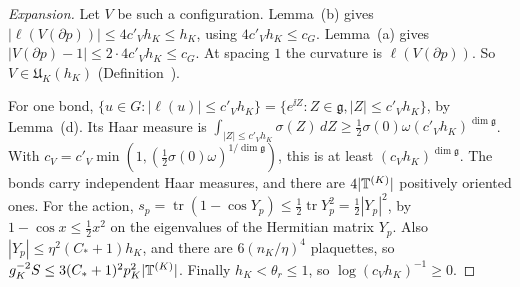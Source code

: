 \begin{proof}[Expansion]
Let $V$ be such a configuration. Lemma~(b) gives $|\ell(V(\partial p))|\le4c'_Vh_K\le h_K$, using $4c'_Vh_K\le c_G$. Lemma~(a) gives $|V(\partial p)-1|\le2\cdot4c'_Vh_K\le c_G$. At spacing $1$ the curvature is $\ell(V(\partial p))$. So $V\in\mathfrak U_K(h_K)$ (Definition~).

For one bond, $\{u\in G:|\ell(u)|\le c'_Vh_K\}=\{e^{\ii Z}:Z\in\mathfrak g,|Z|\le c'_Vh_K\}$, by Lemma~(d). Its Haar measure is $\int_{|Z|\le c'_Vh_K}\sigma(Z)\,dZ\ge\frac12\sigma(0)\omega(c'_Vh_K)^{\dim\mathfrak g}$. With $c_V=c'_V\min(1,(\frac12\sigma(0)\omega)^{1/\dim\mathfrak g})$, this is at least $(c_Vh_K)^{\dim\mathfrak g}$. The bonds carry independent Haar measures, and there are $4|\mathbb T^{(K)}|$ positively oriented ones. For the action, $s_p=\operatorname{tr}(1-\cos Y_p)\le\frac12\operatorname{tr}Y_p^2=\frac12|Y_p|^2$, by $1-\cos x\le\frac12x^2$ on the eigenvalues of the Hermitian matrix $Y_p$. Also $|Y_p|\le\eta^2(C_*+1)h_K$, and there are $6(n_K/\eta)^4$ plaquettes, so $g_K^{-2}S\le3(C_*+1)^2p_K^2|\mathbb T^{(K)}|$. Finally $h_K<\theta_r\le1$, so $\log(c_Vh_K)^{-1}\ge0$.
\end{proof}

